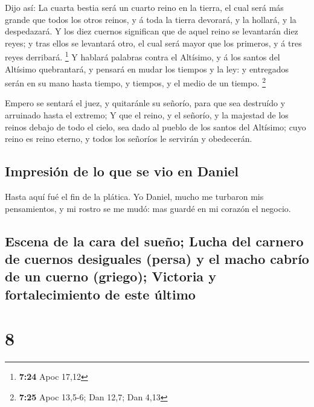  Dijo así: La cuarta bestia será un cuarto reino en la
tierra, el cual será más grande que todos los otros reinos, y á toda la
tierra devorará, y la hollará, y la despedazará.  Y los
diez cuernos significan que de aquel reino se levantarán diez reyes; y
tras ellos se levantará otro, el cual será mayor que los primeros, y á
tres reyes derribará. \footnote{\textbf{7:24} Apoc 17,12} 
Y hablará palabras contra el Altísimo, y á los santos del Altísimo
quebrantará, y pensará en mudar los tiempos y la ley: y entregados serán
en su mano hasta tiempo, y tiempos, y el medio de un tiempo. \footnote{\textbf{7:25}
  Apoc 13,5-6; Dan 12,7; Dan 4,13}

 Empero se sentará el juez, y quitaránle su señorío, para
que sea destruído y arruinado hasta el extremo;  Y que el
reino, y el señorío, y la majestad de los reinos debajo de todo el
cielo, sea dado al pueblo de los santos del Altísimo; cuyo reino es
reino eterno, y todos los señoríos le servirán y obedecerán.

\hypertarget{impresiuxf3n-de-lo-que-se-vio-en-daniel}{%
\subsection{Impresión de lo que se vio en
Daniel}\label{impresiuxf3n-de-lo-que-se-vio-en-daniel}}

 Hasta aquí fué el fin de la plática. Yo Daniel, mucho me
turbaron mis pensamientos, y mi rostro se me mudó: mas guardé en mi
corazón el negocio.

\hypertarget{escena-de-la-cara-del-sueuxf1o-lucha-del-carnero-de-cuernos-desiguales-persa-y-el-macho-cabruxedo-de-un-cuerno-griego-victoria-y-fortalecimiento-de-este-uxfaltimo}{%
\subsection{Escena de la cara del sueño; Lucha del carnero de cuernos
desiguales (persa) y el macho cabrío de un cuerno (griego); Victoria y
fortalecimiento de este
último}\label{escena-de-la-cara-del-sueuxf1o-lucha-del-carnero-de-cuernos-desiguales-persa-y-el-macho-cabruxedo-de-un-cuerno-griego-victoria-y-fortalecimiento-de-este-uxfaltimo}}

\hypertarget{section-7}{%
\section{8}\label{section-7}}

